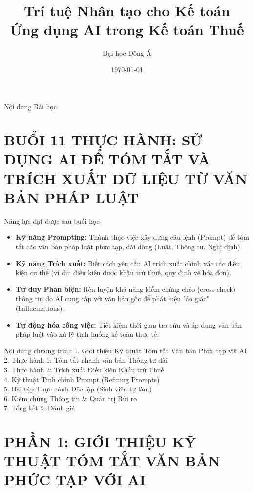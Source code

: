 \documentclass[aspectratio=169]{beamer}
\title[Buổi 11]{Trí tuệ Nhân tạo cho Kế toán \\ \vspace{0.3cm} \Large Ứng dụng AI trong Kế toán Thuế}
\author{Đại học Đông Á}
\date{\today}
\begin{document}
\begin{frame}
    \titlepage
\end{frame}

\begin{frame}{Nội dung Bài học}
    \tableofcontents
\end{frame}


\section{BUỔI 11 THỰC HÀNH: SỬ DỤNG AI ĐỂ TÓM TẮT VÀ TRÍCH XUẤT DỮ LIỆU TỪ VĂN BẢN PHÁP LUẬT}


\begin{frame}{Năng lực đạt được sau buổi học}
    \begin{itemize}
        \item \textbf{Kỹ năng Prompting:} Thành thạo việc xây dựng câu lệnh (Prompt) để tóm tắt các văn bản pháp luật phức tạp, dài dòng (Luật, Thông tư, Nghị định).
        \item \textbf{Kỹ năng Trích xuất:} Biết cách yêu cầu AI trích xuất chính xác các điều kiện cụ thể (ví dụ: điều kiện được khấu trừ thuế, quy định về hóa đơn).
        \item \textbf{Tư duy Phản biện:} Rèn luyện khả năng kiểm chứng chéo (cross-check) thông tin do AI cung cấp với văn bản gốc để phát hiện "ảo giác" (hallucinations).
        \item \textbf{Tự động hóa công việc:} Tiết kiệm thời gian tra cứu và áp dụng văn bản pháp luật vào xử lý tình huống kế toán thực tế.
    \end{itemize}
\end{frame}


\begin{frame}{Nội dung chương trình}
    1. Giới thiệu Kỹ thuật Tóm tắt Văn bản Phức tạp với AI\\
    2. Thực hành 1: Tóm tắt nhanh văn bản Thông tư dài\\
    3. Thực hành 2: Trích xuất Điều kiện Khấu trừ Thuế\\
    4. Kỹ thuật Tinh chỉnh Prompt (Refining Prompts)\\
    5. Bài tập Thực hành Độc lập (Sinh viên tự làm)\\
    6. Kiểm chứng Thông tin \& Quản trị Rủi ro\\
    7. Tổng kết \& Đánh giá\\
\end{frame}


\section{PHẦN 1: GIỚI THIỆU KỸ THUẬT TÓM TẮT VĂN BẢN PHỨC TẠP VỚI AI}
\end{document}
